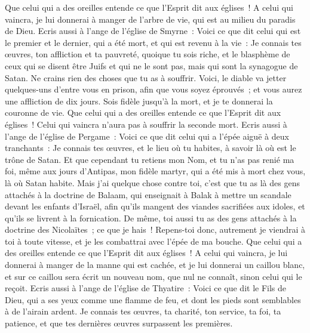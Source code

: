 \begin{multicols}{2}
Que celui qui a des oreilles entende ce que l'Esprit dit aux églises~! A celui qui vaincra, je lui donnerai à manger de l'arbre de vie, qui est au milieu du paradis de Dieu.
Ecris aussi à l'ange de l'église de Smyrne~: Voici ce que dit celui qui est le premier et le dernier, qui a été mort, et qui est revenu à la vie~:
Je connais tes œuvres, ton affliction et ta pauvreté, quoique tu sois riche, et le blasphème de ceux qui se disent être Juifs et qui ne le sont pas, mais qui sont la synagogue de Satan.
Ne crains rien des choses que tu as à souffrir. Voici, le diable va jetter quelques-uns d'entre vous en prison, afin que vous soyez éprouvés~; et vous aurez une affliction de dix jours. Sois fidèle jusqu'à la mort, et je te donnerai la couronne de vie.
Que celui qui a des oreilles entende ce que l'Esprit dit aux églises~! Celui qui vaincra n'aura pas à souffrir la seconde mort.
Ecris aussi à l'ange de l'église de Pergame~: Voici ce que dit celui qui a l'épée aiguë à deux tranchants~:
Je connais tes œuvres, et le lieu où tu habites, à savoir là où est le trône de Satan. Et que cependant tu retiens mon Nom, et tu n'as pas renié ma foi, même aux jours d'Antipas, mon fidèle martyr, qui a été mis à mort chez vous, là où Satan habite.
Mais j'ai quelque chose contre toi, c'est que tu as là des gens attachés à la doctrine de Balaam, qui enseignait à Balak à mettre un scandale devant les enfants d'Israël, afin qu'ils mangent des viandes sacrifiées aux idoles, et qu'ils se livrent à la fornication.
De même, toi aussi tu as des gens attachés à la doctrine des Nicolaïtes~; ce que je hais~!
Repens-toi donc, autrement je viendrai à toi à toute vitesse, et je les combattrai avec l'épée de ma bouche.
Que celui qui a des oreilles entende ce que l'Esprit dit aux églises~! A celui qui vaincra, je lui donnerai à manger de la manne qui est cachée, et je lui donnerai un caillou blanc, et sur ce caillou sera écrit un nouveau nom, que nul ne connaît, sinon celui qui le reçoit.
Ecris aussi à l'ange de l'église de Thyatire~: Voici ce que dit le Fils de Dieu, qui a ses yeux comme une flamme de feu, et dont les pieds sont semblables à de l'airain ardent.
Je connais tes œuvres, ta charité, ton service, ta foi, ta patience, et que tes dernières œuvres surpassent les premières.

\end{multicols}
